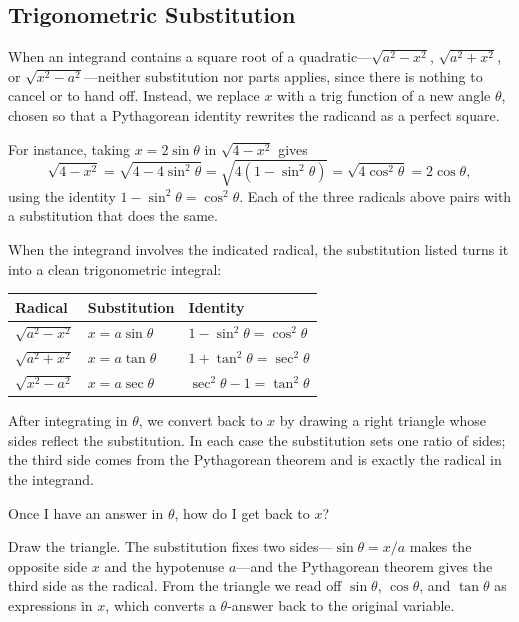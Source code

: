 
\subsection{Trigonometric Substitution}

When an integrand contains a square root of a quadratic---$\sqrt{a^2 - x^2}$,
$\sqrt{a^2 + x^2}$, or $\sqrt{x^2 - a^2}$---neither substitution nor parts
applies, since there is nothing to cancel or to hand off. Instead, we replace
$x$ with a trig function of a new angle $\theta$, chosen so that a Pythagorean
identity rewrites the radicand as a perfect square.

For instance, taking $x = 2\sin\theta$ in $\sqrt{4 - x^2}$ gives
\[
	\sqrt{4 - x^2}
	   = \sqrt{4 - 4\sin^2\theta}
	   = \sqrt{4(1 - \sin^2\theta)}
	   = \sqrt{4\cos^2\theta}
	   = 2\cos\theta,
\]
using the identity $1 - \sin^2\theta = \cos^2\theta$. Each of the three radicals
above pairs with a substitution that does the same.

\begin{theorem}
	When the integrand involves the indicated radical, the substitution
	listed turns it into a clean trigonometric integral:
	\begin{center}
		\begin{tabular}{lll}
			\hline
			Radical & Substitution & Identity \\
			\hline
			$\sqrt{a^2 - x^2}$ & $x = a\sin\theta$ & $1 - \sin^2\theta = \cos^2\theta$ \\
			$\sqrt{a^2 + x^2}$ & $x = a\tan\theta$ & $1 + \tan^2\theta = \sec^2\theta$ \\
			$\sqrt{x^2 - a^2}$ & $x = a\sec\theta$ & $\sec^2\theta - 1 = \tan^2\theta$ \\
			\hline
		\end{tabular}
	\end{center}
\end{theorem}

After integrating in $\theta$, we convert back to $x$ by drawing a right
triangle whose sides reflect the substitution. In each case the substitution
sets one ratio of sides; the third side comes from the Pythagorean theorem and
is exactly the radical in the integrand.

\begin{question}
	Once I have an answer in $\theta$, how do I get back to $x$?

	\answer Draw the triangle. The substitution fixes two sides---$\sin\theta =
	x/a$ makes the opposite side $x$ and the hypotenuse $a$---and the Pythagorean
	theorem gives the third side as the radical. From the triangle we read off
	$\sin\theta$, $\cos\theta$, and $\tan\theta$ as expressions in $x$, which
	converts a $\theta$-answer back to the original variable.
\end{question}

